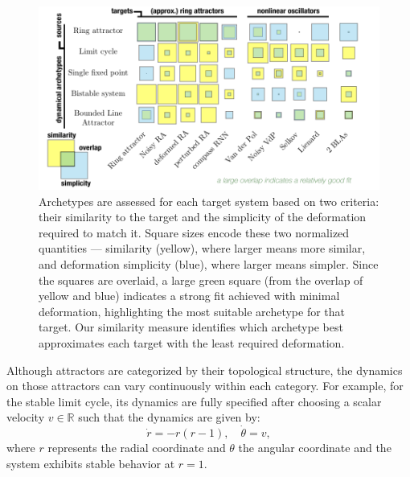 \documentclass{article}
\theoremstyle{definition} \newtheorem{definition}{Definition}  \newtheorem{example}{Example}
\theoremstyle{remark} \newtheorem{remark}{Remark}
\newcounter{ct}
\newcommand{\field}[1]{\ensuremath{\mathbb{#1}}}
\newcommand{\reals}{\field{R}}
\begin{document}
\begin{figure}[t!b!hp]
    \centering
    \includegraphics[width=\linewidth]{archetype2target}
    \caption{Archetypes are assessed for each target system based on two criteria: their similarity to the target and the simplicity of the deformation required to match it. Square sizes encode these two normalized quantities --- similarity (yellow), where larger means more similar, and deformation simplicity (blue), where larger means simpler.
     Since the squares are overlaid, a large green square (from the overlap of yellow and blue) indicates a strong fit achieved with minimal deformation, highlighting the most suitable archetype for that target.
 Our similarity measure identifies which archetype best approximates each target with the least required deformation.
    }
    \label{fig:archetype2target}
\end{figure}

Although attractors are categorized by their topological structure, the dynamics on those attractors can vary continuously within each category. For example, for the stable limit cycle, its dynamics are fully specified after choosing a scalar velocity $v\in \reals$ such that the dynamics are given by:
\begin{equation}
\dot{r} =  -r (r - 1), %
\quad \dot{\theta} = v,
\end{equation}
where \( r \) represents the radial coordinate and \( \theta \) the angular coordinate and the system exhibits stable behavior at \( r = 1 \).
\end{document}
